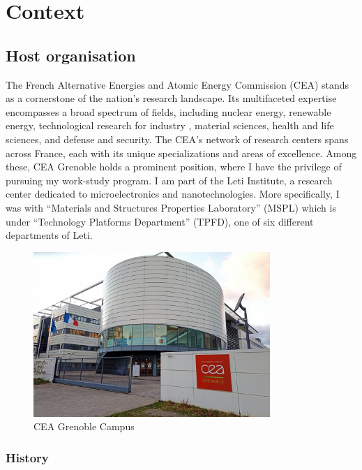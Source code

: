 \section{Context}
\subsection{Host organisation}

\medskip

The French Alternative Energies and Atomic Energy Commission (CEA) stands as a cornerstone
of the nation's research landscape. Its multifaceted expertise encompasses a broad spectrum
of fields, including nuclear energy, renewable energy, technological research for industry
, material sciences, health and life sciences, and defense and security. The CEA's network
of research centers spans across France, each with its unique specializations and areas
of excellence. Among these, CEA Grenoble holds a prominent position, where I have the 
privilege of pursuing my work-study program. I am part of the Leti Institute,
a research center dedicated to microelectronics and nanotechnologies. More specifically, 
I was with “Materials and Structures Properties Laboratory” (MSPL) which is under “Technology Platforms 
Department” (TPFD), one of six different departments of Leti.


\begin{figure}[h!]
    \centering
    \includegraphics[width=0.8\textwidth]{images/ceaphoto.jpg}
    \caption{CEA Grenoble Campus}
\end{figure}

\FloatBarrier

\subsubsection{History}

